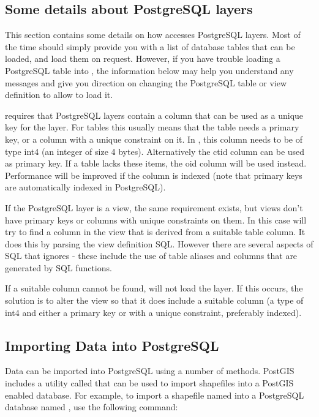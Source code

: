 \subsection{Some details about PostgreSQL
layers}\label{sec:postgis_details}

This section contains some details on how \qg accesses PostgreSQL
layers. Most of the time \qg should simply provide you with a list of
database tables that can be loaded, and load them on request. However,
if you have trouble loading a PostgreSQL table into \qg, the information
below may help you understand any \qg messages and give you direction on
changing the PostgreSQL table or view definition to allow \qg to load it.

\qg requires that PostgreSQL layers contain a column that can be
used as a unique key for the layer. For tables this usually means
that the table needs a primary key, or a column with a unique
constraint on it. In \qg, this column needs to be of
type int4 (an integer of size 4 bytes). Alternatively the ctid column can be
used as primary key. If a table lacks these items,
the oid column will be used instead. Performance will be improved if the
column is indexed (note that primary keys are automatically indexed in
PostgreSQL).

If the PostgreSQL layer is a view, the same requirement exists, but
views don't have primary keys or columns with unique constraints on
them. In this case \qg will try to find a column in the view that is
derived from a suitable table column. It does this by parsing the view
definition SQL. However there are several aspects of SQL that \qg ignores
- these include the use of table aliases and columns that are generated by
SQL functions.

If a suitable column cannot be found, \qg will not load the layer. If this
occurs, the solution is to alter the view so that it does include a suitable
column (a type of int4 and either a primary key or with a unique constraint,
preferably indexed).


\subsection{Importing Data into PostgreSQL}\label{sec:loading_postgis_data}

Data can be imported into PostgreSQL using a number of methods. PostGIS
includes a utility called  that can be used to import shapefiles into
a PostGIS enabled database. For example, to import a shapefile named
into a PostgreSQL database named , use the following command:

